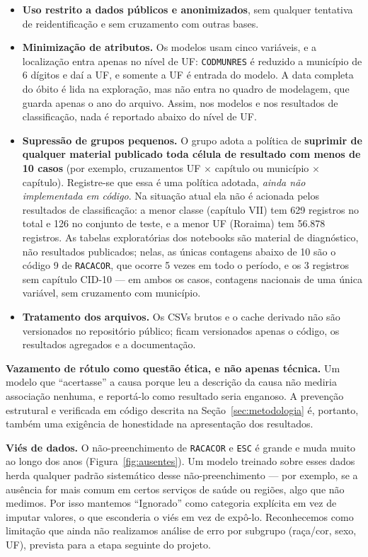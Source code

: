 \documentclass[12pt]{article}
\begin{document}
\begin{itemize}
  \item \textbf{Uso restrito a dados públicos e anonimizados}, sem qualquer
    tentativa de reidentificação e sem cruzamento com outras bases.
  \item \textbf{Minimização de atributos.} Os modelos usam cinco variáveis, e
    a localização entra apenas no nível de UF: \texttt{CODMUNRES} é reduzido a
    município de 6 dígitos e daí a UF, e somente a UF é entrada do modelo. A
    data completa do óbito é lida na exploração, mas não entra no quadro de
    modelagem, que guarda apenas o ano do arquivo. Assim, nos modelos e nos
    resultados de classificação, nada é reportado abaixo do nível de UF.
  \item \textbf{Supressão de grupos pequenos.} O grupo adota a política de
    \textbf{suprimir de qualquer material publicado toda célula de resultado
    com menos de 10 casos} (por exemplo, cruzamentos UF $\times$ capítulo ou
    município $\times$ capítulo). Registre-se que essa é uma política adotada,
    \emph{ainda não implementada em código}. Na situação atual ela não é
    acionada pelos resultados de classificação: a menor classe (capítulo VII)
    tem 629 registros no total e 126 no conjunto de teste, e a menor UF
    (Roraima) tem 56.878 registros. As tabelas exploratórias dos notebooks são
    material de diagnóstico, não resultados publicados; nelas, as únicas
    contagens abaixo de 10 são o código 9 de \texttt{RACACOR}, que ocorre 5
    vezes em todo o período, e os 3 registros sem capítulo CID-10 --- em ambos
    os casos, contagens nacionais de uma única variável, sem cruzamento com
    município.
  \item \textbf{Tratamento dos arquivos.} Os CSVs brutos e o cache derivado não
    são versionados no repositório público; ficam versionados apenas o código,
    os resultados agregados e a documentação.
\end{itemize}

\textbf{Vazamento de rótulo como questão ética, e não apenas técnica.} Um
modelo que ``acertasse'' a causa porque leu a descrição da causa não mediria
associação nenhuma, e reportá-lo como resultado seria enganoso. A prevenção
estrutural e verificada em código descrita na Seção~\ref{sec:metodologia} é,
portanto, também uma exigência de honestidade na apresentação dos resultados.

\textbf{Viés de dados.} O não-preenchimento de \texttt{RACACOR} e \texttt{ESC}
é grande e muda muito ao longo dos anos (Figura~\ref{fig:ausentes}). Um modelo
treinado sobre esses dados herda qualquer padrão sistemático desse
não-preenchimento --- por exemplo, se a ausência for mais comum em certos
serviços de saúde ou regiões, algo que não medimos. Por isso mantemos
``Ignorado'' como categoria explícita em vez de imputar valores, o que
esconderia o viés em vez de expô-lo. Reconhecemos como limitação que ainda não
realizamos análise de erro por subgrupo (raça/cor, sexo, UF), prevista para a
etapa seguinte do projeto.
\end{document}
